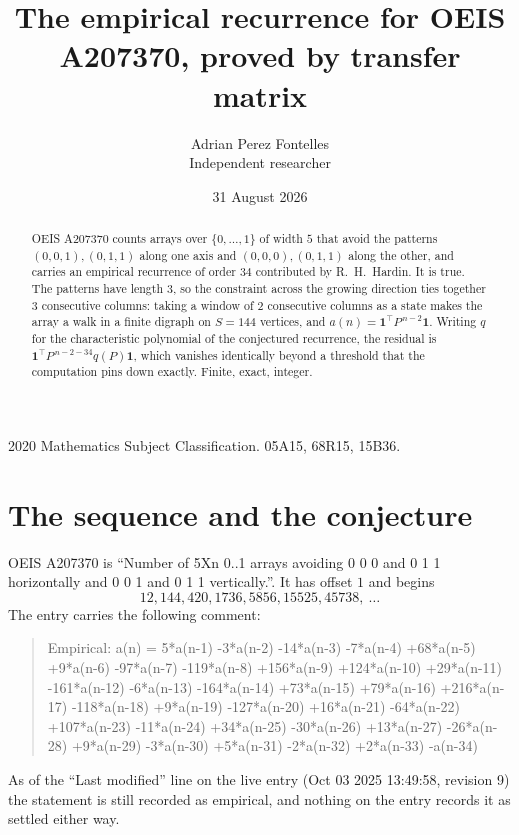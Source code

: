 \documentclass[11pt,a4paper]{article}
\title{The empirical recurrence for OEIS A207370, proved by transfer matrix}
\author{Adrian Perez Fontelles\\ \small Independent researcher}
\date{31 August 2026}
\theoremstyle{plain}
\theoremstyle{definition}
\begin{document}
\maketitle

\begin{abstract}
OEIS A207370 counts arrays over $\{0,\dots,1\}$ of width $5$ that avoid the patterns
$(0,0,1), (0,1,1)$ along one axis and $(0,0,0), (0,1,1)$ along the other, and carries an empirical recurrence of
order $34$ contributed by R.~H.~Hardin. It is true. The patterns have length $3$, so
the constraint across the growing direction ties together $3$ consecutive columns: taking a
window of $2$ consecutive columns as a state makes the array a walk in a finite digraph
on $S=144$ vertices, and $a(n)=\mathbf{1}^{\!\top}P^{\,n-2}\mathbf{1}$. Writing $q$
for the characteristic polynomial of the conjectured recurrence, the residual is
$\mathbf{1}^{\!\top}P^{\,n-2-34}q(P)\mathbf{1}$, which vanishes identically
beyond a threshold that the computation pins down exactly. Finite, exact, integer.
\end{abstract}

\noindent\small 2020 Mathematics Subject Classification. 05A15, 68R15, 15B36.\normalsize

\section{The sequence and the conjecture}

OEIS A207370 is ``Number of 5Xn 0..1 arrays avoiding 0 0 0 and 0 1 1 horizontally and 0 0 1 and 0 1 1 vertically.''. It has offset
$1$ and begins
\[
12, 144, 420, 1736, 5856, 15525, 45738,\ \dots
\]
The entry carries the following comment:
\begin{quote}\small
Empirical: a(n) = 5*a(n-1) -3*a(n-2) -14*a(n-3) -7*a(n-4) +68*a(n-5) +9*a(n-6) -97*a(n-7) -119*a(n-8) +156*a(n-9) +124*a(n-10) +29*a(n-11) -161*a(n-12) -6*a(n-13) -164*a(n-14) +73*a(n-15) +79*a(n-16) +216*a(n-17) -118*a(n-18) +9*a(n-19) -127*a(n-20) +16*a(n-21) -64*a(n-22) +107*a(n-23) -11*a(n-24) +34*a(n-25) -30*a(n-26) +13*a(n-27) -26*a(n-28) +9*a(n-29) -3*a(n-30) +5*a(n-31) -2*a(n-32) +2*a(n-33) -a(n-34)
\end{quote}
As of the ``Last modified'' line on the live entry (Oct 03 2025 13:49:58, revision
9) the statement is still recorded as empirical, and nothing on the entry
records it as settled either way.
\end{document}
